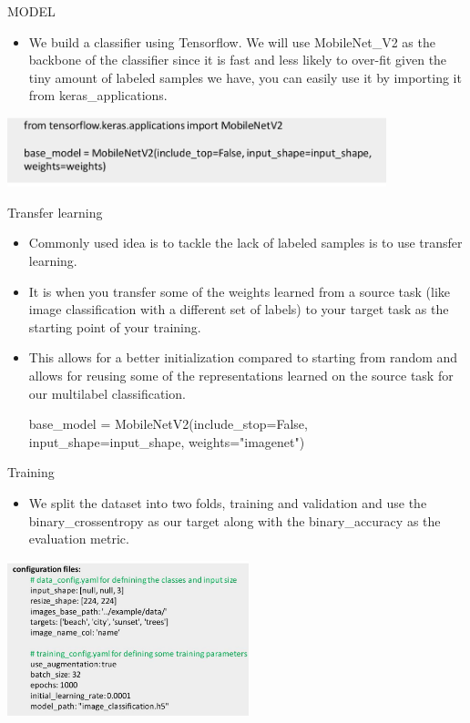 \documentclass[aspectratio=169,12pt,usenames,dvipsnames]{beamer}
\begin{document}
\begin{frame}[t]{MODEL}
\begin{itemize}
  \item We build a classifier using Tensorflow. We will use MobileNet\_V2 as the backbone of the classifier since it is fast and less likely to over-fit given the tiny amount of labeled samples we have, you can easily use it by importing it from keras\_applications.\\
\end{itemize}
\centering
\includegraphics[width=11cm]{FastAPI_Images/AIML_FastAPI_IMG3.png}
\end{frame}


\begin{frame}[t]{Transfer learning}
\begin{itemize}
  \item Commonly used idea is to tackle the lack of labeled samples is to use transfer learning.

  \item It is when you transfer some of the weights learned from a source task (like image classification with a different set of labels) to your target task as the starting point of your training.

   \item This allows for a better initialization compared to starting from random and allows for reusing some of the representations learned on the source task for our multilabel classification.\break

   \centering
   \small {base\_model = MobileNetV2(include\_stop=False, input\_shape=input\_shape, weights="imagenet")}

\end{itemize}
\end{frame}



\begin{frame}[t]{Training}
\begin{itemize}
  \item We split the dataset into two folds, training and validation and use the binary\_crossentropy as our target along with the binary\_accuracy as the evaluation metric.
\end{itemize}
\includegraphics[width=7cm]{FastAPI_Images/AIML_FastAPI_IMG4.png}
\end{frame}
\end{document}
